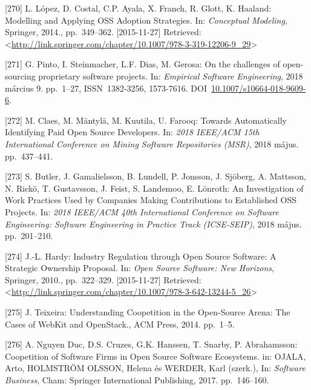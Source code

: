\documentclass[12pt,magyar,a4paper,oneside]{scrreprt}
\newenvironment{cslreferences}%
  {}%
  {\par}
\begin{document}
\begin{cslreferences}
\leavevmode\hypertarget{ref-lopez_modelling_2014}{}%
{[}270{]} L. López, D. Costal, C.P. Ayala, X. Franch, R. Glott, K.
Haaland: Modelling and Applying OSS Adoption Strategies. In:
\emph{Conceptual Modeling}, Springer, 2014., pp.~349--362.
{[}2015-11-27{]} Retrieved:
\textless{}\url{http://link.springer.com/chapter/10.1007/978-3-319-12206-9_29}\textgreater{}

\leavevmode\hypertarget{ref-pinto_challenges_2018}{}%
{[}271{]} G. Pinto, I. Steinmacher, L.F. Dias, M. Gerosa: On the
challenges of open-sourcing proprietary software projects. In:
\emph{Empirical Software Engineering}, 2018 március 9. pp.~1--27,
ISSN~1382-3256, 1573-7616.
DOI~\href{https://doi.org/10.1007/s10664-018-9609-6}{10.1007/s10664-018-9609-6}.

\leavevmode\hypertarget{ref-claes_towards_2018}{}%
{[}272{]} M. Claes, M. Mäntylä, M. Kuutila, U. Farooq: Towards
Automatically Identifying Paid Open Source Developers. In: \emph{2018
IEEE/ACM 15th International Conference on Mining Software Repositories
(MSR)}, 2018 május. pp.~437--441.

\leavevmode\hypertarget{ref-butler_investigation_2018}{}%
{[}273{]} S. Butler, J. Gamalielsson, B. Lundell, P. Jonsson, J.
Sjöberg, A. Mattsson, N. Rickö, T. Gustavsson, J. Feist, S. Landemoo, E.
Lönroth: An Investigation of Work Practices Used by Companies Making
Contributions to Established OSS Projects. In: \emph{2018 IEEE/ACM 40th
International Conference on Software Engineering: Software Engineering
in Practice Track (ICSE-SEIP)}, 2018 május. pp.~201--210.

\leavevmode\hypertarget{ref-hardy_industry_2010}{}%
{[}274{]} J.-L. Hardy: Industry Regulation through Open Source Software:
A Strategic Ownership Proposal. In: \emph{Open Source Software: New
Horizons}, Springer, 2010., pp.~322--329. {[}2015-11-27{]} Retrieved:
\textless{}\url{http://link.springer.com/chapter/10.1007/978-3-642-13244-5_26}\textgreater{}

\leavevmode\hypertarget{ref-teixeira_understanding_2014}{}%
{[}275{]} J. Teixeira: Understanding Coopetition in the Open-Source
Arena: The Cases of WebKit and OpenStack., ACM Press, 2014. pp.~1--5.

\leavevmode\hypertarget{ref-nguyen_duc_coopetition_2017}{}%
{[}276{]} A. Nguyen Duc, D.S. Cruzes, G.K. Hanssen, T. Snarby, P.
Abrahamsson: Coopetition of Software Firms in Open Source Software
Ecosystems. in: OJALA, Arto, HOLMSTRÖM OLSSON, Helena és WERDER, Karl
(szerk.), In: \emph{Software Business}, Cham: Springer International
Publishing, 2017. pp.~146--160.


\end{cslreferences}
\end{document}

